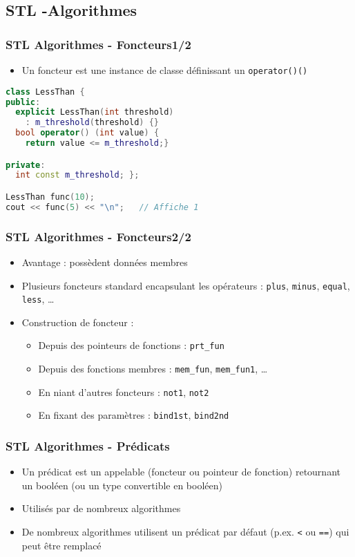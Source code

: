 \documentclass[C++.tex]{subfiles}
\begin{document}
\subsection*{STL -Algorithmes}
\begin{frame}[fragile]
	\frametitle{STL Algorithmes - Foncteurs\titlehfill{}1/2}
	\begin{itemize}
		\item Un foncteur est une instance de classe définissant un \lstinline|operator()()|
	\end{itemize}

	\begin{lstlisting}[language=C++]
class LessThan {
public:
  explicit LessThan(int threshold)
    : m_threshold(threshold) {}
  bool operator() (int value) { 
    return value <= m_threshold;}

private:
  int const m_threshold; };

LessThan func(10);
cout << func(5) << "\n";   // Affiche 1\end{lstlisting}
\end{frame}

\begin{frame}
	\frametitle{STL Algorithmes - Foncteurs\titlehfill{}2/2}
	\begin{itemize}
		\item Avantage : possèdent données membres
		\item Plusieurs foncteurs standard encapsulant les opérateurs : \lstinline|plus|, \lstinline|minus|, \lstinline|equal|, \lstinline|less|, \ldots
		\item Construction de foncteur :
		\begin{itemize}
			\item Depuis des pointeurs de fonctions : \lstinline|prt_fun|
			\item Depuis des fonctions membres : \lstinline|mem_fun|, \lstinline|mem_fun1|, \ldots
			\item En niant d'autres foncteurs : \lstinline|not1|, \lstinline|not2|
			\item En fixant des paramètres : \lstinline|bind1st|, \lstinline|bind2nd|
		\end{itemize}
	\end{itemize}
\end{frame}

\begin{frame}
	\frametitle{STL Algorithmes - Prédicats}
	\begin{itemize}
		\item Un prédicat est un \og appelable\fg{} (foncteur ou pointeur de fonction) retournant un booléen (ou un type convertible en booléen)
		\item Utilisés par de nombreux algorithmes
		\item De nombreux algorithmes utilisent un prédicat par défaut (p.ex. \lstinline|<| ou \lstinline|==|) qui peut être remplacé
	\end{itemize}
\end{frame}
\end{document}
